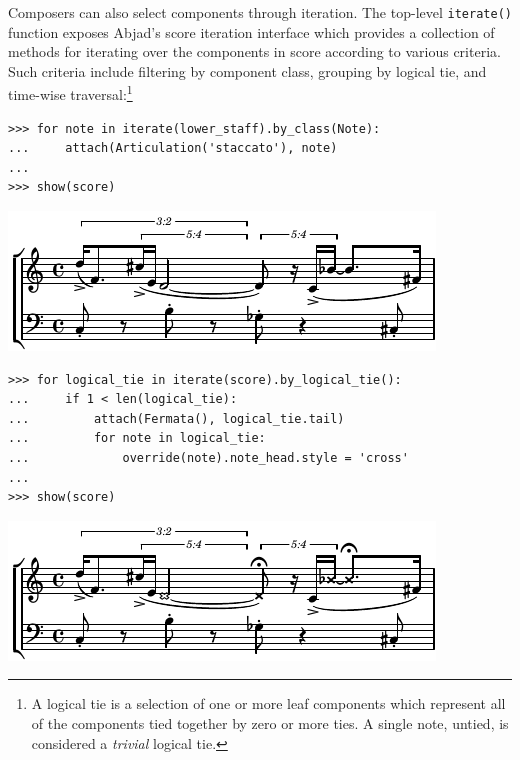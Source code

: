 \documentclass{article}
\begin{document}
Composers can also select components through iteration. The top-level
\texttt{iterate()} function exposes Abjad's score iteration interface which
provides a collection of methods for iterating over the components in score
according to various criteria. Such criteria include filtering by component
class, grouping by logical tie, and time-wise traversal:\footnote{A logical tie
is a selection of one or more leaf components which represent all of the
components tied together by zero or more ties. A single note, untied, is
considered a \emph{trivial} logical tie.}

\begin{lstlisting}
>>> for note in iterate(lower_staff).by_class(Note):
...     attach(Articulation('staccato'), note)
...
>>> show(score)
\end{lstlisting}
\includegraphics{assets/lilypond-b7a01ad584c3c470c0bbff20fbc76741.pdf}

\begin{lstlisting}
>>> for logical_tie in iterate(score).by_logical_tie():
...     if 1 < len(logical_tie):
...         attach(Fermata(), logical_tie.tail)
...         for note in logical_tie:
...             override(note).note_head.style = 'cross'
...
>>> show(score)
\end{lstlisting}
\includegraphics{assets/lilypond-a692b35a07435259861a4299267be394.pdf}
\end{document}
